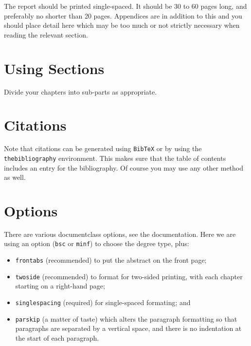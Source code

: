 \documentclass[bsc,logo,twoside,fullspacing,parskip]{infthesis}
\begin{document}
The report should be printed single-spaced.
It should be 30 to 60 pages long, and preferably no shorter than 20 pages.
Appendices are in addition to this and you should place detail
here which may be too much or not strictly necessary when reading the relevant section.

\section{Using Sections}

Divide your chapters into sub-parts as appropriate.

\section{Citations}

Note that citations 
can be generated using {\tt BibTeX} or by using the
{\tt thebibliography} environment. This makes sure that the
table of contents includes an entry for the bibliography.
Of course you may use any other method as well.

\section{Options}

There are various documentclass options, see the documentation.  Here we are
using an option ({\tt bsc} or {\tt minf}) to choose the degree type, plus:
\begin{itemize}
\item {\tt frontabs} (recommended) to put the abstract on the front page;
\item {\tt twoside} (recommended) to format for two-sided printing, with
  each chapter starting on a right-hand page;
\item {\tt singlespacing} (required) for single-spaced formating; and
\item {\tt parskip} (a matter of taste) which alters the paragraph formatting so that
paragraphs are separated by a vertical space, and there is no
indentation at the start of each paragraph.
\end{itemize}



\end{document}
